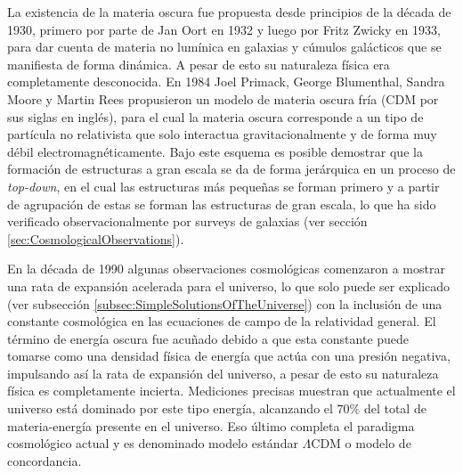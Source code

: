 La existencia de la materia oscura fue propuesta desde principios de la 
década de 1930, primero por parte de Jan Oort en 1932 y luego por Fritz
Zwicky en 1933, para dar cuenta de materia no lumínica en galaxias y 
cúmulos galácticos que se manifiesta de forma dinámica. A pesar de esto 
su naturaleza física era completamente desconocida. En 1984 Joel Primack,
George Blumenthal, Sandra Moore y Martin Rees propusieron un modelo de 
materia oscura fría (CDM por sus siglas en inglés), para el cual la 
materia oscura corresponde a un tipo de partícula no relativista que solo
interactua gravitacionalmente y de forma muy débil electromagnéticamente.
Bajo este esquema es posible demostrar que la formación de estructuras a 
gran escala se da de forma jerárquica en un proceso de \textit{top-down},
en el cual las estructuras más pequeñas se forman primero y a partir de 
agrupación de estas se forman las estructuras de gran escala, lo que ha 
sido verificado observacionalmente por surveys de galaxias (ver sección
\ref{sec:CosmologicalObservations}).


En la década de 1990 algunas observaciones cosmológicas comenzaron a 
mostrar una rata de expansión acelerada para el universo, lo que solo 
puede ser explicado (ver subsección \ref{subsec:SimpleSolutionsOfTheUniverse})
con la inclusión de una constante cosmológica en las ecuaciones de campo
de la relatividad general. El término de energía oscura fue acuñado debido 
a que esta constante puede tomarse como una densidad física de energía que
actúa con una presión negativa, impulsando así la rata de expansión del 
universo, a pesar de esto su naturaleza física es completamente incierta.
Mediciones precisas muestran que actualmente el universo está dominado por 
este tipo energía, alcanzando el $70 \%$ del total de materia-energía 
presente en el universo. Eso último completa el paradigma cosmológico 
actual y es denominado modelo estándar $\Lambda$CDM o modelo de 
concordancia.

